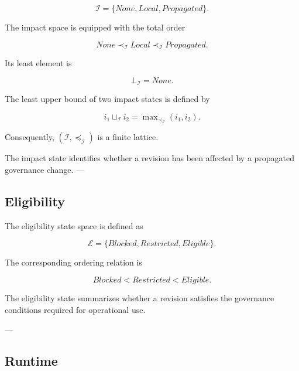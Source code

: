 \documentclass[10pt]{article}
\begin{document}
\begin{equation}
	\mathcal{I}=
	\{
	None,
	Local,
	Propagated
	\}.
	\label{eq:impact_space}
\end{equation}

The impact space is equipped with the total order

\begin{equation}
	None
	\prec_{\mathcal I}
	Local
	\prec_{\mathcal I}
	Propagated.
	\label{eq:impact_order}
\end{equation}

Its least element is

\begin{equation}
	\bot_{\mathcal{I}}
	=
	None.
	\label{eq:impact_bottom}
\end{equation}

The least upper bound of two impact states is defined by

\begin{equation}
	i_1
	\sqcup_{\mathcal{I}}
	i_2
	=
	\max\nolimits_{\prec_{\mathcal{I}}}
	\left(i_1,i_2\right).
	\label{eq:impact_join}
\end{equation}

Consequently,
$\left(\mathcal{I},\preceq_{\mathcal{I}}\right)$ is a finite lattice.

The impact state identifies whether a revision has been affected by a propagated governance change.
---

\subsection{Eligibility}

The eligibility state space is defined as

\begin{equation}
	\mathcal{E}=
	\{
	Blocked,
	Restricted,
	Eligible
	\}.
	\label{eq:eligibility_space}
\end{equation}

The corresponding ordering relation is

\begin{equation}
	Blocked
	<
	Restricted
	<
	Eligible.
	\label{eq:eligibility_order}
\end{equation}

The eligibility state summarizes whether a revision satisfies the governance conditions required for operational use.

---

\subsection{Runtime}
\end{document}
